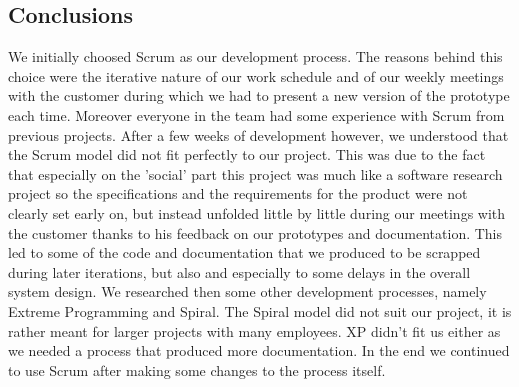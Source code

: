 \subsection{Conclusions}
We initially choosed Scrum as our development process. The reasons behind this choice were the iterative nature
of our work schedule and of our weekly meetings with the customer during which we had to present a new version
of the prototype each time. Moreover everyone in the team had some experience with Scrum from previous projects.
After a few weeks of development however, we understood that the Scrum model did not fit perfectly to our project.
This was due to the fact that especially on the 'social' part this project was much like a software research project
so the specifications and the requirements for the product were not clearly set early on, but instead unfolded little
by little during our meetings with the customer thanks to his feedback on our prototypes and documentation.
This led to some of the code and documentation that we produced to be scrapped during later iterations,
but also and especially to some delays in the overall system design. We researched then some other development
processes, namely Extreme Programming and Spiral. The Spiral model did not suit our project, it is rather meant
for larger projects with many employees. XP didn't fit us either as we needed a process that produced more documentation.
In the end we continued to use Scrum after making some changes to the process itself.

